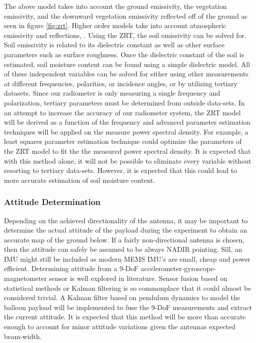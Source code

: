 \documentclass[12pt]{article}
\begin{document}
\begin{enumerate}
The above model takes into account the ground emissivity, the vegetation emissivity, and the downward vegetation emissivity reflected off of the ground as seen in figure \ref{fig:zrt}. Higher order models take into account atmospheric emissivity and reflections, . Using the ZRT, the soil emissivity can be solved for. Soil emissivity is related to its dielectric constant as well as other surface parameters such as surface roughness. Once the dielectric constant of the soil is estimated, soil moisture content can be found using a simple dielectric model. All of these independent variables can be solved for either using other measurements at different frequencies, polarities, or incidence angles, or by utilizing tertiary datasets. Since our radiometer is only measuring a single frequency and polarization, tertiary parameters must be determined from outside data-sets. In an attempt to increase the accuracy of our radiometer system, the ZRT model will be derived as a function of the frequency and advanced parameter estimation techniques will be applied on the measure power spectral density. For example, a least squares parameter estimation technique could optimize the parameters of the ZRT model to fit the the measured power spectral density. It is expected that with this method alone, it will not be possible to eliminate every variable without resorting to tertiary data-sets. However, it is expected that this could lead to more accurate estimation of soil moisture content.
\end{enumerate}

\subsubsection{Attitude Determination}

Depending on the achieved directionality of the antenna, it may be important to determine the actual attitude of the payload during the experiment to obtain an accurate map of the ground below. If a fairly non-directional antenna is chosen, then the attitude can safely be assumed to be always NADIR pointing. Sill, an IMU might still be included as modern MEMS IMU's are small, cheap and power efficient. Determining attitude from a 9-DoF accelerometer-gyroscope-magnetometer sensor is well explored in literature. Sensor fusion based on statistical methods or Kalman filtering is so commonplace that it could almost be considered trivial. A Kalman filter based on pendulum dynamics to model the balloon payload will be implemented to fuse the 9-DoF measurements and extract the current attitude. It is expected that this method will be more than accurate enough to account for minor attitude variations given the antennas expected beam-width. \cite{Vujicic2016} \cite{Estimation2017} \cite{Rhudy2017} \cite{Chow} \cite{Wan}
\end{document}

